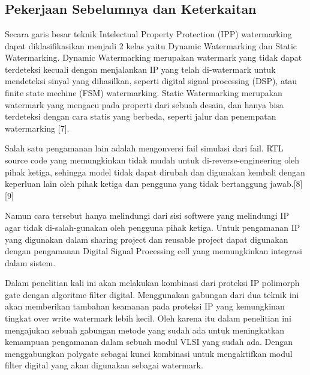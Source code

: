 \chapter{\babDua}

\section{Pekerjaan Sebelumnya dan Keterkaitan}
Secara garis besar teknik Intelectual Property Protection (IPP)
watermarking dapat diklasifikasikan menjadi 2 kelas yaitu Dynamic
Watermarking dan Static Watermarking. Dynamic Watermarking merupakan
watermark yang tidak dapat terdeteksi kecuali dengan menjalankan IP yang telah
di-watermark untuk mendeteksi sinyal yang dihasilkan, seperti digital signal
processing (DSP), atau finite state mechine (FSM) watermarking. Static
Watermarking merupakan watermark yang mengacu pada properti dari sebuah
desain, dan hanya bisa terdeteksi dengan cara statis yang berbeda, seperti jalur dan
penempatan watermarking [7].

Salah satu pengamanan lain adalah mengonversi fail simulasi dari fail.
RTL source code yang memungkinkan tidak mudah untuk di-reverse-engineering
oleh pihak ketiga, sehingga model tidak dapat dirubah dan digunakan kembali
dengan keperluan lain oleh pihak ketiga dan pengguna yang tidak bertanggung
jawab.[8][9]

Namun cara tersebut hanya melindungi dari sisi softwere yang melindungi
IP agar tidak di-salah-gunakan oleh pengguna pihak ketiga. Untuk pengamanan IP
yang digunakan dalam sharing project dan reusable project dapat digunakan
dengan pengamanan Digital Signal Processing cell yang memungkinkan integrasi
dalam sistem.

Dalam penelitian kali ini akan melakukan kombinasi dari proteksi IP
polimorph gate dengan algoritme filter digital. Menggunakan gabungan dari dua
teknik ini akan memberikan tambahan keamanan pada proteksi IP yang
kemungkinan tingkat over write watermark lebih kecil. Oleh karena itu dalam
penelitian ini mengajukan sebuah gabungan metode yang sudah ada untuk
meningkatkan kemampuan pengamanan dalam sebuah modul VLSI yang sudah
ada. Dengan menggabungkan polygate sebagai kunci kombinasi untuk
mengaktifkan modul filter digital yang akan digunakan sebagai watermark.


